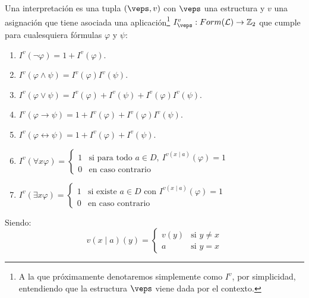 \begin{definicion}[Interpretación]
    Una interpretación es una tupla $(\veps,v)$ con $\veps$ una estructura y $v$ una asignación que tiene asociada una aplicación\footnote{A la que próximamente denotaremos simplemente como $I^v$, por simplicidad, entendiendo que la estructura $\veps$ viene dada por el contexto.} $I_\veps^v:Form(\mathcal{L})\to\mathbb{Z}_2$ que cumple para cualesquiera fórmulas $\varphi$ y $\psi$:
    \begin{enumerate}
        \item $I^v(\lnot \varphi) = 1+ I^v(\varphi)$.
        \item $I^v(\varphi\land \psi) = I^v(\varphi)I^v(\psi)$.
        \item $I^v(\varphi\lor \psi) = I^v(\varphi) + I^v(\psi) + I^v(\varphi)I^v(\psi)$.
        \item $I^v(\varphi\to \psi) = 1 + I^v(\varphi) + I^v(\varphi)I^v(\psi)$.
        \item $I^v(\varphi\leftrightarrow \psi) = 1 + I^v(\varphi) + I^v(\psi)$.
        \item $I^v(\forall x\varphi) = \left\{\begin{array}{ll}
                    1 & \text{si para todo\ } a\in D,\ I^{v(x\mid a)}(\varphi) = 1 \\
                    0 & \text{en caso contrario}
        \end{array}\right.$
        \item $I^v(\exists x\varphi) = \left\{\begin{array}{ll}
                    1 & \text{si existe\ } a\in D \text{\ con\ } I^{v(x\mid a)}(\varphi) = 1 \\
                    0 & \text{en caso contrario}
        \end{array}\right.$
    \end{enumerate}
    Siendo:
    \begin{equation*}
        v(x\mid a)(y) = \left\{\begin{array}{ll}
                v(y) & \text{si\ } y\neq x \\
                a & \text{si\ } y=x
        \end{array}\right.
    \end{equation*}
\end{definicion}
